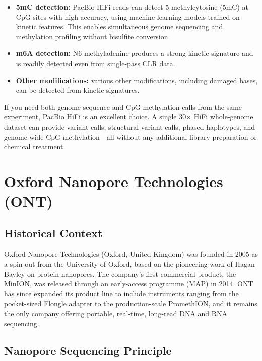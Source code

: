 \begin{itemize}[nosep]
  \item \textbf{5mC detection:} PacBio HiFi reads can detect 5-methylcytosine (5mC) at CpG sites with high accuracy, using machine learning models trained on kinetic features. This enables simultaneous genome sequencing and methylation profiling without bisulfite conversion.
  \item \textbf{m6A detection:} N6-methyladenine produces a strong kinetic signature and is readily detected even from single-pass CLR data.
  \item \textbf{Other modifications:} various other modifications, including damaged bases, can be detected from kinetic signatures.
\end{itemize}

\begin{tipbox}[title={PacBio Kinetics for Epigenomics}]
If you need both genome sequence and CpG methylation calls from the same experiment, PacBio HiFi is an excellent choice. A single 30$\times$ HiFi whole-genome dataset can provide variant calls, structural variant calls, phased haplotypes, and genome-wide CpG methylation---all without any additional library preparation or chemical treatment.
\end{tipbox}


\section{Oxford Nanopore Technologies (ONT)}
\label{sec:ont}

\subsection{Historical Context}

Oxford Nanopore Technologies (Oxford, United Kingdom) was founded in 2005 as a spin-out from the University of Oxford, based on the pioneering work of Hagan Bayley on protein nanopores. The company's first commercial product, the MinION, was released through an early-access programme (MAP) in 2014. ONT has since expanded its product line to include instruments ranging from the pocket-sized Flongle adapter to the production-scale PromethION, and it remains the only company offering portable, real-time, long-read DNA and RNA sequencing.

\subsection{Nanopore Sequencing Principle}

